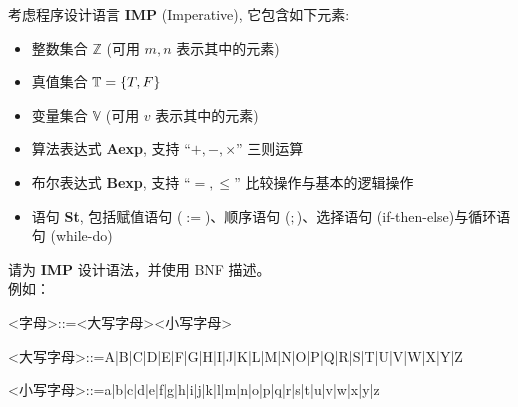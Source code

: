 \documentclass[a4paper, justified]{tufte-handout}
\begin{document}
\begin{problem}[IMP]
考虑程序设计语言 {\bf IMP} (Imperative), 它包含如下元素:
\begin{itemize}
  \item 整数集合 $\mathbb{Z}$ (可用 $m,n$ 表示其中的元素)
  \item 真值集合 $\mathbb{T} = \{T, F\}$
  \item 变量集合 $\mathbb{V}$ (可用 $v$ 表示其中的元素)
  \item 算法表达式 {\bf Aexp}, 支持 ``$+, -, \times$'' 三则运算
  \item 布尔表达式 {\bf Bexp}, 支持 ``$=, \le$'' 比较操作与基本的逻辑操作
  \item 语句 {\bf St}, 包括赋值语句 ($:=$)、顺序语句 ($;$)、选择语句 (if-then-else)与循环语句 (while-do)
\end{itemize}

\noindent 请为 {\bf IMP} 设计语法，并使用 BNF 描述。\\
\noindent 例如：
\item  <字母>::=<大写字母><小写字母>\\
\item <大写字母>::=A|B|C|D|E|F|G|H|I|J|K|L|M|N|O|P|Q|R|S|T|U|V|W|X|Y|Z\\
\item <小写字母>::=a|b|c|d|e|f|g|h|i|j|k|l|m|n|o|p|q|r|s|t|u|v|w|x|y|z\\
\end{problem}
\end{document}
